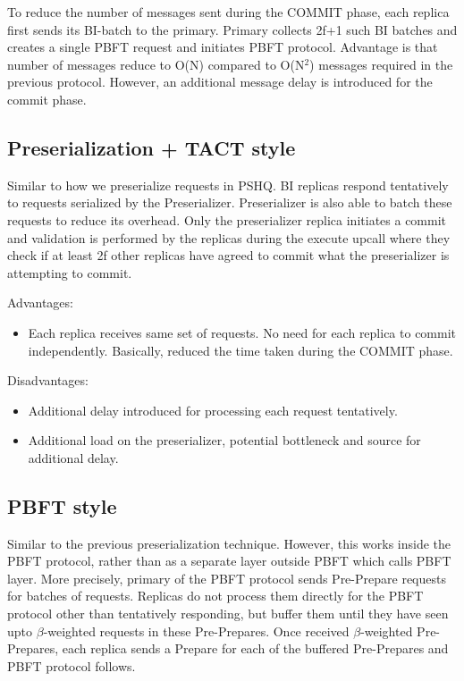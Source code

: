 To reduce the number of messages sent during the COMMIT phase, each replica first
sends its BI-batch to the primary. Primary collects 2f+1 such BI batches and creates
a single PBFT request and initiates PBFT protocol. Advantage is that number of messages
reduce to O(N) compared to O(N$^2$) messages required in the previous protocol. However,
an additional message delay is introduced for the commit phase.


\subsection{Preserialization + TACT style}

Similar to how we preserialize requests in PSHQ. BI replicas respond tentatively to 
requests serialized by the Preserializer. Preserializer is also able to batch these
requests to reduce its overhead. Only the preserializer replica initiates a commit
and validation is performed by the replicas during the execute upcall where they check
if at least 2f other replicas have agreed to commit what the preserializer is attempting
to commit.

Advantages:
\begin{itemize}
\item{} Each replica receives same set of requests. No need for each replica to commit
independently. Basically, reduced the time taken during the COMMIT phase.
\end{itemize}

Disadvantages:
\begin{itemize}
\item{} Additional delay introduced for processing each request tentatively. 
\item{} Additional load on the preserializer, potential bottleneck and source for additional delay.
\end{itemize}

\subsection{PBFT style}
Similar to the previous preserialization technique. However, this works inside the PBFT protocol, rather
than as a separate layer outside PBFT which calls PBFT layer. More precisely, primary of the PBFT
protocol sends Pre-Prepare requests for batches of requests. Replicas do not process them directly for
the PBFT protocol other than tentatively responding, but buffer them until they have seen 
upto $\beta$-weighted requests in these 
Pre-Prepares. Once received $\beta$-weighted Pre-Prepares, each replica sends a Prepare for each of the
buffered Pre-Prepares and PBFT protocol follows. 


